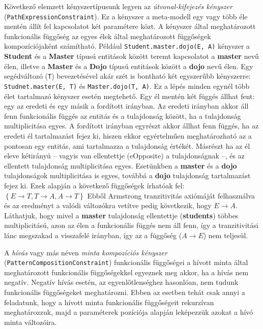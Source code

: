 \begin{sloppypar}
Következő elemzett kényszertípusunk legyen az \emph{útvonal-kifejezés kényszer} (\texttt{PathExpressionConstraint}).
Ez a kényszer a meta-modell egy vagy több éle mentén állít fel kapcsolatot két paramétere közt.
A kényszer által meghatározott funkcionális függőség az egyes élek által meghatározott függőségek kompozíciójaként számítható.
Például \texttt{Student.master.dojo(E, A)} kényszer a \textbf{Student} és a \textbf{Master} típusú entitások között teremt kapcsolatot a \textbf{master} nevű élen, illetve a \textbf{Master} és a \textbf{Dojo} típusú entitások között a \textbf{dojo} nevű élen.
Egy segédváltozó (\texttt{T}) bevezetésével akár szét is bontható két egyszerűbb kényszerre: \texttt{Studnet.master(E, T)} és \texttt{Master.dojo(T, A)}.
Ez a lépés minden egynél több élet tartalmazó kényszer esetén megtehető.
Egy él mentén két függés állhat fent: egy az eredeti és egy másik a fordított irányban.
Az eredeti irányban akkor áll fenn funkcionális függés az entitás és a tulajdonság között, ha a tulajdonság multiplicitása egyes.
A fordított irányban egyrészt akkor állhat fenn függés, ha az eredeti él tartalmazást fejez ki, hiszen ekkor egyértelműen meghatározható az a pontosan egy entitás, ami tartalmazza a tulajdonság értékét.
Másrészt ha az él eleve kétirányú -- vagyis van ellentettje (eOpposite) a tulajdonságnak --, és az ellentett tulajdonság multiplicitása egyes.
Esetünkben a \textbf{master} és a \textbf{dojo} tulajdonságok multiplicitása is egyes, továbbá a \textbf{dojo} tulajdonság tartalmazást fejez ki.
Ezek alapján a következő függőségek írhatóak fel: $\left\{ E \rightarrow T, T \rightarrow A, A \rightarrow T \right\}$
Ebből Armstrong tranzitivitás axiómáját felhasználva és az eredményt a valódi változókra vetítve pedig következik, hogy $E \rightarrow A$.
Láthatjuk, hogy mivel a \textbf{master} tulajdonság ellentettje (\textbf{students}) többes multiplicitású, azon az élen a funkcionális függés nem áll fenn, így a tranzitivitási lánc megszakad a visszafelé irányban, így az a függőség ($A \rightarrow E$) nem teljesül.
\end{sloppypar}

A \emph{hívás} vagy más néven \emph{minta kompozíciós kényszer} (\texttt{PatternCompositionConstraint}) funkcionális függőségei a hívott minta által meghatározott funkcionális függőségekkel egyeznek meg akkor, ha a hívás nem negatív.
Negatív hívás esetén, az egyenlőtlenséghez hasonlóan, nem tudunk funkcionális függőségeket meghatározni.
Ebben az esetben tehát csak annyi a feladatunk, hogy a hívott minta funkcionális függőségeit rekurzívan meghatározzuk, majd a paraméterek pozíciója alapján leképezzük azokat a hívó minta változóira.

